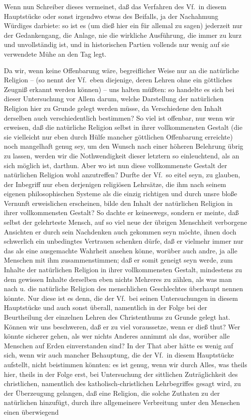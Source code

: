 Wenn nun Schreiber dieses vermeinet, daß das Verfahren des Vf.\ in diesem Hauptstücke oder sonst irgendwo etwas des Beifalls, ja der Nachahmung Würdiges darbiete: so ist es (um dieß hier ein für allemal zu sagen) jederzeit nur der Gedankengang, die Anlage, nie die wirkliche Ausführung, die immer zu kurz und unvollständig ist, und in historischen Partien vollends nur wenig auf sie verwendete Mühe an den Tag legt. \par
Da wir, wenn keine Offenbarung wäre, begreiflicher Weise nur an die natürliche Religion -- (so nennt der Vf.\ eben diejenige, deren Lehren ohne ein göttliches Zeugniß erkannt werden können) -- uns halten müßten: so handelte es sich bei dieser Untersuchung vor Allem darum, welche Darstellung der natürlichen Religion hier zu Grunde gelegt werden müsse, da Verschiedene den Inhalt derselben auch verschiedentlich bestimmen? So viel ist offenbar, nur wenn wir erweisen, daß die natürliche Religion selbst in ihrer vollkommensten Gestalt (die sie vielleicht nur eben durch Hülfe mancher göttlichen Offenbarung erreichte) noch mangelhaft genug sey, um den Wunsch nach einer höheren Belehrung übrig zu lassen, werden wir die Nothwendigkeit dieser letztern so einleuchtend, als an sich möglich ist, darthun. Aber wo ist nun diese vollkommenste Gestalt der natürlichen Religion wohl anzutreffen? Durfte der Vf.\ so eitel seyn, zu glauben, der Inbegriff nur eben derjenigen religiösen Lehrsätze, die ihm nach seinem eigenen philosophischen Systeme als die einzig richtigen und durch unsre bloße Vernunft erweislichen erscheinen, bilde den Inhalt der natürlichen Religion in ihrer vollkommensten Gestalt? So dachte er keineswegs, sondern er meinte, daß selbst der gelehrteste Mensch, auf so viel neue der übrigen Menschheit verborgene Ansichten er durch sein Nachdenken auch gekommen seyn möchte, ihnen doch schwerlich ein unbedingtes Vertrauen schenken dürfe, daß er vielmehr immer nur das als eine ausgemachte Wahrheit ansehen könne, worüber auch andre, ja  alle Menschen mit ihm zusammenstimmen; daß er somit geneigt seyn werde, zum Inhalte der natürlichen Religion in ihrer vollkommensten Gestalt, mindestens zu dem gewissen Inhalte derselben eben nichts Mehreres zu zählen, als was man nach  u.  die natürliche Religion des menschlichen Geschlechtes überhaupt nennen könnte. Nur diese ist es denn, die der Vf.\ bei seinen Untersuchungen in diesem Hauptstücke und auch sonst überall, namentlich in der Folge bei der Beurtheilung der einzelnen Lehren des Christenthums zu Grunde gelegt hat. Können wir uns beschweren, daß er zu viel voraussetze, wenn er dieß thut? Wer könnte sicherer gehen, als wer nichts Anderes annimmt als das, worüber alle Menschen auf Erden einverstanden sind? In der That aber hätte es wenig auf sich, wenn wir auch mancher Behauptung, die der Vf.\ in diesem Hauptstücke aufstellt, nicht beistimmen könnten: es ist genug, wenn wir durch Alles, was theils hier, theils in der Folge erst, bei Untersuchung der sittlichen Zuträglichkeit des christlichen, namentlich des katholisch-christlichen Lehrbegriffes gesagt wird, zu der Überzeugung gelangen, daß eine Religion, die solche Zuthaten zu der natürlichen hinzufügt, durch ihre allgemeinere Verbreitung unter den Menschen einen überwiegend 